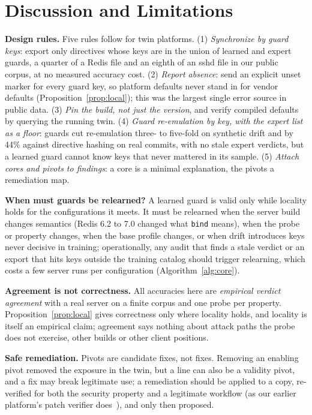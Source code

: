 \documentclass[conference]{IEEEtran}
\begin{document}
\section{Discussion and Limitations}\label{sec:discussion}

\textbf{Design rules.} Five rules follow for twin platforms. (1) \emph{Synchronize by guard keys}: export only directives whose keys are in the union of learned and expert guards, a quarter of a Redis file and an eighth of an sshd file in our public corpus, at no measured accuracy cost. (2) \emph{Report absence}: send an explicit unset marker for every guard key, so platform defaults never stand in for vendor defaults (Proposition~\ref{prop:local}); this was the largest single error source in public data. (3) \emph{Pin the build, not just the version}, and verify compiled defaults by querying the running twin. (4) \emph{Guard re-emulation by key, with the expert list as a floor}: guards cut re-emulation three- to five-fold on synthetic drift and by 44\% against directive hashing on real commits, with no stale expert verdicts, but a learned guard cannot know keys that never mattered in its sample. (5) \emph{Attach cores and pivots to findings}: a core is a minimal explanation, the pivots a remediation map.

\textbf{When must guards be relearned?} A learned guard is valid only while locality holds for the configurations it meets. It must be relearned when the server build changes semantics (Redis 6.2 to 7.0 changed what \texttt{bind} means), when the probe or property changes, when the base profile changes, or when drift introduces keys never decisive in training; operationally, any audit that finds a stale verdict or an export that hits keys outside the training catalog should trigger relearning, which costs a few server runs per configuration (Algorithm~\ref{alg:core}).

\textbf{Agreement is not correctness.} All accuracies here are \emph{empirical verdict agreement} with a real server on a finite corpus and one probe per property. Proposition~\ref{prop:local} gives correctness only where locality holds, and locality is itself an empirical claim; agreement says nothing about attack paths the probe does not exercise, other builds or other client positions.

\textbf{Safe remediation.} Pivots are candidate fixes, not fixes. Removing an enabling pivot removed the exposure in the twin, but a line can also be a validity pivot, and a fix may break legitimate use; a remediation should be applied to a copy, re-verified for both the security property and a legitimate workflow (as our earlier platform's patch verifier does~\cite{dtplatform}), and only then proposed.
\end{document}
